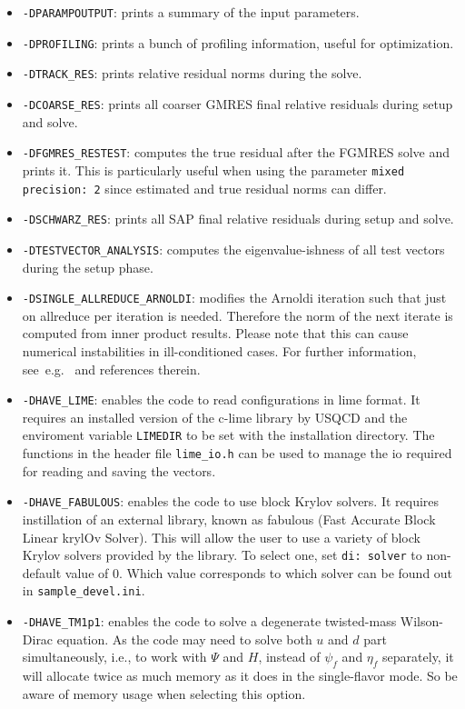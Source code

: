 \documentclass[a4paper,12pt]{scrartcl}
\begin{document}
\begin{itemize}
  \item \texttt{-DPARAMPOUTPUT}: prints a summary of the input parameters.
  \item \texttt{-DPROFILING}: prints a bunch of profiling information, useful for optimization.
  \item \texttt{-DTRACK\_RES}: prints relative residual norms during the solve. 
  \item \texttt{-DCOARSE\_RES}: prints all coarser GMRES final relative residuals during setup and solve.
  \item \texttt{-DFGMRES\_RESTEST}: computes the true residual after the FGMRES solve and prints it. This is particularly useful when using the parameter \texttt{mixed precision:~2} since estimated and true residual norms can differ.
  \item \texttt{-DSCHWARZ\_RES}: prints all SAP final relative residuals during setup and solve.
  \item \texttt{-DTESTVECTOR\_ANALYSIS}: computes the eigenvalue-ishness of all test vectors during the setup phase.
  \item \texttt{-DSINGLE\_ALLREDUCE\_ARNOLDI}: modifies the Arnoldi iteration such that just on allreduce per iteration is needed. Therefore the norm of the next iterate is computed from inner product results. Please note that this can cause numerical instabilities in ill-conditioned cases. For further information, see~e.g.~\cite{RottmannPhD} and references therein.
  \item \texttt{-DHAVE\_LIME}: enables the code to read configurations in lime format. It requires an installed version of the c-lime library by USQCD and the enviroment variable \texttt{LIMEDIR} to be set with the installation directory. The functions in the header file \texttt{lime\_io.h} can be used to manage the io required for reading and saving the vectors.
  \item \texttt{-DHAVE\_FABULOUS}: enables the code to use block Krylov solvers.  It requires instillation of an external library, known as fabulous (Fast Accurate Block Linear krylOv Solver).  This will allow the user to use a variety of block Krylov solvers provided by the library.  To select one, set \texttt{di:~solver} to non-default value of 0.  Which value corresponds to which solver can be found out in \texttt{sample\_devel.ini}.
  \item \texttt{-DHAVE\_TM1p1}: enables the code to solve a degenerate twisted-mass Wilson-Dirac equation.  As the code may need to solve both $u$ and $d$ part simultaneously, i.e., to work with $\Psi$ and $H$, instead of $\psi_f$ and $\eta_f$ separately, it will allocate twice as much memory as it does in the single-flavor mode.  So be aware of memory usage when selecting this option.
\end{itemize}
\end{document}
